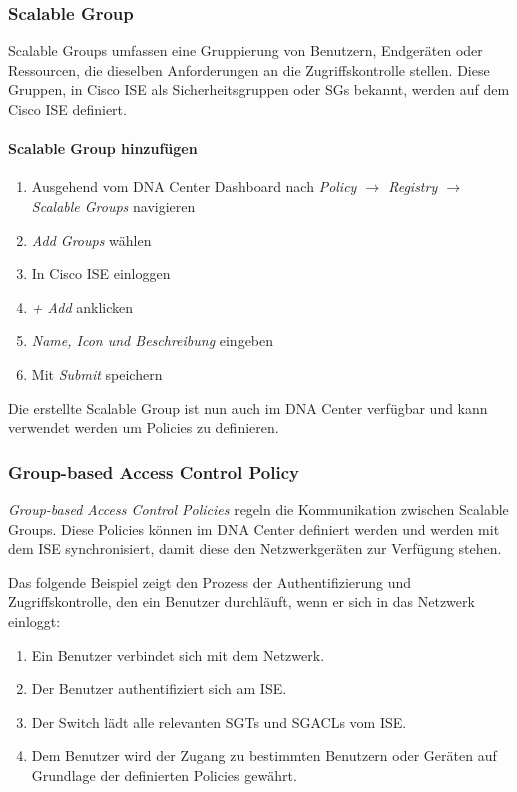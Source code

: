 \subsubsection{Scalable Group}
Scalable Groups umfassen eine Gruppierung von Benutzern, Endgeräten oder Ressourcen, die dieselben Anforderungen an die Zugriffskontrolle stellen. Diese Gruppen, in Cisco ISE als Sicherheitsgruppen oder SGs bekannt, werden auf dem Cisco ISE definiert. 

\paragraph{Scalable Group hinzufügen}
\begin{enumerate}
	\item Ausgehend vom DNA Center Dashboard nach \textit{Policy $\rightarrow$ Registry $\rightarrow$ Scalable Groups} navigieren
	\item \textit{Add Groups} wählen
	\item In Cisco ISE einloggen
	\item \textit{+ Add} anklicken
	\item \textit{Name, Icon und Beschreibung} eingeben 
	\item Mit \textit{Submit} speichern
\end{enumerate}
Die erstellte Scalable Group ist nun auch im DNA Center verfügbar und kann verwendet werden um Policies zu definieren.

\subsubsection{Group-based Access Control Policy}
\textit{Group-based Access Control Policies} regeln die Kommunikation zwischen Scalable Groups. Diese Policies können im DNA Center definiert werden und werden mit dem ISE synchronisiert, damit diese den Netzwerkgeräten zur Verfügung stehen.

Das folgende Beispiel zeigt den Prozess der Authentifizierung und Zugriffskontrolle, den ein Benutzer durchläuft, wenn er sich in das Netzwerk einloggt:
\begin{enumerate}
	\item Ein Benutzer verbindet sich mit dem Netzwerk.
	\item Der Benutzer authentifiziert sich am ISE.
	\item Der Switch lädt alle relevanten SGTs und SGACLs vom ISE.
	\item  Dem Benutzer wird der Zugang zu bestimmten Benutzern oder Geräten auf Grundlage der definierten Policies gewährt.
\end{enumerate}

